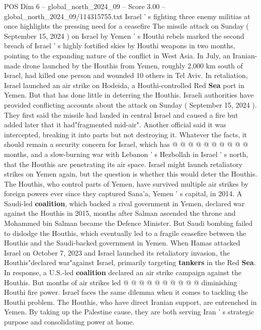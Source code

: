 \begin{textsample}{POS Dim 6 – global\_north\_2024\_09 – Score 3.00 – global\_north\_2024\_09/114315755.txt}  \label{ex:f6_pos_370}
Israel ' s fighting three enemy militias at once highlights the pressing need for a ceasefire The missile attack on Sunday ( September 15, 2024 ) on Israel by Yemen ' s Houthi rebels marked the second breach of Israel ' s highly fortified skies by Houthi weapons in two months, pointing to the expanding nature of the conflict in West Asia.
In July, an Iranian-made drone launched by the Houthis from Yemen, roughly 2,000 km south of Israel, had killed one person and wounded 10 others in Tel Aviv.
In retaliation, Israel launched an air strike on Hodeida, a Houthi-controlled Red \textbf{Sea} port in Yemen.
But that has done little in deterring the Houthis.
Israeli authorities have provided conflicting accounts about the attack on Sunday ( September 15, 2024 ).
They first said the missile had landed in central Israel and caused a fire but added later that it had"fragmented mid-air".
Another official said it was intercepted, breaking it into parts but not destroying it.
Whatever the facts, it should remain a security concern for Israel, which has @ @ @ @ @ @ @ @ @ @ months, and a slow-burning war with Lebanon ' s Hezbollah in Israel ' s north, that the Houthis are penetrating its air space.
Israel might launch retaliatory strikes on Yemen again, but the question is whether this would deter the Houthis.
The Houthis, who control parts of Yemen, have survived multiple air strikes by foreign powers ever since they captured Sana'a, Yemen ' s capital, in 2014.
A Saudi-led \textbf{coalition}, which backed a rival government in Yemen, declared war against the Houthis in 2015, months after Salman ascended the throne and Mohammed bin Salman became the Defence Minister.
But Saudi bombing failed to dislodge the Houthis, which eventually led to a fragile ceasefire between the Houthis and the Saudi-backed government in Yemen.
When Hamas attacked Israel on October 7, 2023 and Israel launched its retaliatory invasion, the Houthis"declared war"against Israel, primarily targeting \textbf{tankers} in the Red \textbf{Sea}.
In response, a U.S.-led \textbf{coalition} declared an air strike campaign against the Houthis.
But months of air strikes led @ @ @ @ @ @ @ @ @ @ diminishing Houthi fire power.
Israel faces the same dilemma when it comes to tackling the Houthi problem.
The Houthis, who have direct Iranian support, are entrenched in Yemen.
By taking up the Palestine cause, they are both serving Iran ' s strategic purpose and consolidating power at home.

\end{textsample}
